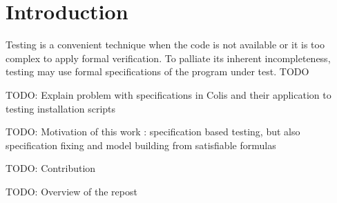 
\section{Introduction}

Testing is a convenient technique when the code is not available or
it is too complex to apply formal verification. To palliate its inherent 
incompleteness, testing may use formal specifications of the program under test.
TODO


TODO: Explain problem with specifications in Colis 
      and their application to testing installation scripts


TODO: Motivation of this work : specification based testing, 
	but also specification fixing and model building from satisfiable formulas
	
TODO: Contribution

TODO: Overview of the repost